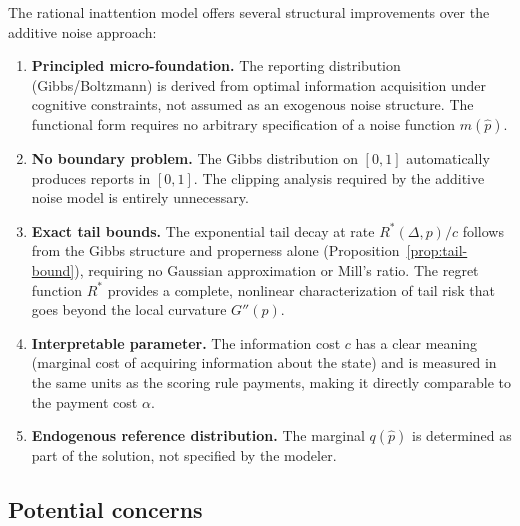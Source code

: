 \documentclass[11pt]{article}
\begin{document}
The rational inattention model offers several structural improvements over the additive noise approach:

\begin{enumerate}
\item \textbf{Principled micro-foundation.} The reporting distribution (Gibbs/Boltzmann) is derived from optimal information acquisition under cognitive constraints, not assumed as an exogenous noise structure. The functional form requires no arbitrary specification of a noise function $m(\hat{p})$.

\item \textbf{No boundary problem.} The Gibbs distribution on $[0,1]$ automatically produces reports in $[0,1]$. The clipping analysis required by the additive noise model is entirely unnecessary.

\item \textbf{Exact tail bounds.} The exponential tail decay at rate $R^*(\Delta,p)/c$ follows from the Gibbs structure and properness alone (Proposition~\ref{prop:tail-bound}), requiring no Gaussian approximation or Mill's ratio. The regret function $R^*$ provides a complete, nonlinear characterization of tail risk that goes beyond the local curvature $G''(p)$.

\item \textbf{Interpretable parameter.} The information cost $c$ has a clear meaning (marginal cost of acquiring information about the state) and is measured in the same units as the scoring rule payments, making it directly comparable to the payment cost $\alpha$.

\item \textbf{Endogenous reference distribution.} The marginal $q(\hat{p})$ is determined as part of the solution, not specified by the modeler.
\end{enumerate}

\subsection{Potential concerns}
\end{document}
